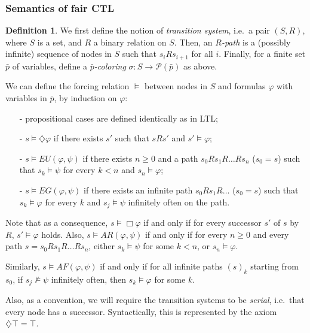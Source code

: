 \documentclass[11pt]{article}
\newcommand{\dia}{{\diamondsuit}}
\theoremstyle{definition}
\newtheorem*{definition}{Definition}
\begin{document}
\subsubsection*{Semantics of fair CTL}\label{subsec:sem_CTLf}
\begin{definition}\label{forcing_rel_CTLf}
    We first define the notion of \emph{transition system}, i.e.\ a pair $(S,R)$, where $S$ is a set, and $R$ a binary relation on $S$. 
    Then, an \emph{$R$-path} is a (possibly infinite) sequence of nodes in $S$ such that $s_i R s_{i+1}$ for all $i$. 
    Finally, for a finite set $\bar{p}$ of variables, define a \emph{$\bar{p}$-coloring} $\sigma : S \to \mathcal{P}(\bar{p})$ as above.

    We can define the forcing relation $\models$ between nodes in $S$ and formulas $\varphi$ with variables in $\bar{p}$, by induction on $\varphi$:
    \begin{itemize}
        \setlength\itemsep{0em}
        \item[-] propositional cases are defined identically as in LTL;
        \item[-] $s\models \dia\varphi$ if there exists $s'$ such that $sRs'$ and $s'\models \varphi$;
        \item[-] $s\models EU(\varphi,\psi)$ if there exists $n\geq 0$ and a path $s_0Rs_1R\ldots Rs_n$ ($s_0=s$) such that $s_k\models\psi$ for every $k<n$ and $s_n\models\varphi$;
        \item[-] $s\models EG(\varphi,\psi)$ if there exists an infinite path $s_0Rs_1R\ldots $ ($s_0=s$) such that $s_k\models\varphi$ for every $k$ and $s_j\models\psi$ infinitely often on the path.       
    \end{itemize}

\end{definition}

Note that as a consequence, $s\models\Box\varphi$ if and only if for every successor $s'$ of $s$ by $R$, $s'\models\varphi$ holds.
Also, $s\models AR(\varphi,\psi)$ if and only if for every $n\geq 0$ and every path $s=s_0Rs_1R\ldots Rs_n$, either $s_k\models\psi$ for some $k<n$, or $s_n\models\varphi$.

Similarly, $s\models AF(\varphi,\psi)$ if and only if for all infinite paths ${(s)}_k$ starting from $s_0$, if $s_j\not\models\psi$ infinitely often, then $s_k\models\varphi$ for some $k$.

Also, as a convention, we will require the transition systems to be \emph{serial}, i.e.~that every node has a successor. Syntactically, this is represented by the axiom $\dia\top = \top$.
\end{document}
